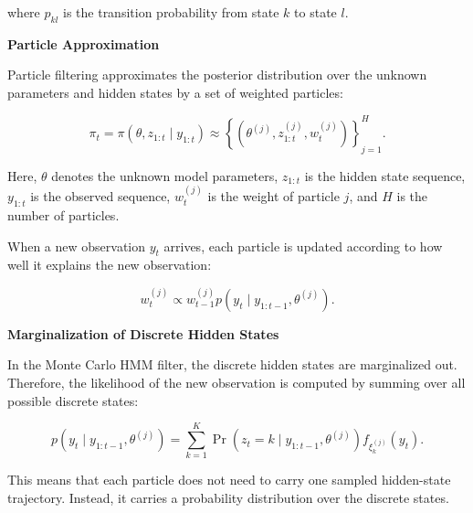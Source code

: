 \documentclass{book}
\providecommand{\ProjectDeepHeading}[2]{%
    \par\medskip\noindent\textbf{#2}\par\smallskip
}
\begin{document}
        where \(p_{kl}\) is the transition probability from state \(k\) to state \(l\).
    
    
    \ProjectDeepHeading{12}{Particle Approximation}
        
        Particle filtering approximates the posterior distribution over the unknown parameters and hidden states by a set of weighted particles:
        
        \[
            \ensuremath{\pi}_t
            =
            \ensuremath{\pi}
            \left(
                \ensuremath{\theta},
            z_{1:t}
                \mid
                y_{1:t}
            \right)
            \approx
            \left\{
                \left(
                    \ensuremath{\theta}^{(j)},
                z_{1:t}^{(j)},
                w_t^{(j)}
                \right)
            \right\}_{j=1}^{H}.
        \]
        
        Here, \(\ensuremath{\theta}\) denotes the unknown model parameters, \(z_{1:t}\) is the hidden state sequence, \(y_{1:t}\) is the observed sequence, \(w_t^{(j)}\) is the weight of particle \(j\), and \(H\) is the number of particles.
        
        When a new observation \(y_t\) arrives, each particle is updated according to how well it explains the new observation:
        
        \[
            w_t^{(j)}
            \propto
            w_{t-1}^{(j)}
            p
            \left(
                y_t
                \mid
                y_{1:t-1},
                \ensuremath{\theta}^{(j)}
            \right).
        \]
    
    
    \ProjectDeepHeading{12}{Marginalization of Discrete Hidden States}
        
        In the Monte Carlo HMM filter, the discrete hidden states are marginalized out. Therefore, the likelihood of the new observation is computed by summing over all possible discrete states:
        
        \[
            p
            \left(
                y_t
                \mid
                y_{1:t-1},
                \ensuremath{\theta}^{(j)}
            \right)
            =
            \sum_{k=1}^{K}
            \Pr
            \left(
                z_t = k
                \mid
                y_{1:t-1},
                \ensuremath{\theta}^{(j)}
            \right)
            f_{\ensuremath{\xi}_k^{(j)}}(y_t).
        \]
        
        This means that each particle does not need to carry one sampled hidden-state trajectory. Instead, it carries a probability distribution over the discrete states.
        
\end{document}
